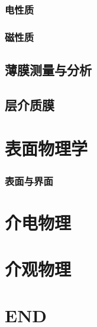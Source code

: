 \documentclass[UTF8]{../06-Physics}
\begin{document}
    \subsection{电性质}
    \subsection{磁性质}
\section{薄膜测量与分析}
\section{层介质膜}




\chapter{表面物理学}

    \subsection{表面与界面}


\chapter{介电物理}



\chapter{介观物理}




\chapter{END}
\end{document}

